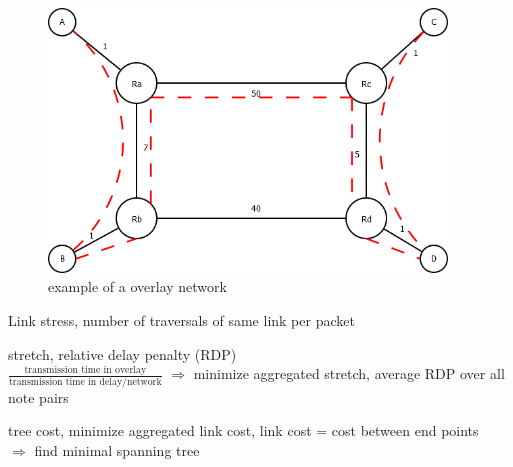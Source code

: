 \documentclass[ngerman,a4paper]{report}
\begin{document}
\begin{figure}[h]
	\centering
	\includegraphics[width=400px]{gfx/overlay_example.png}
	\caption{example of a overlay network}
	\label{img:ovrlnt}
\end{figure}

\begin{compactenum}
	\item Link stress, number of traversals of same link per packet
	\item stretch, relative delay penalty (RDP)\\
		$\frac{\text{transmission time in overlay}}{\text{transmission time in delay/network}}$
		$\Rightarrow$ minimize aggregated stretch, average RDP over all note pairs
	\item tree cost, minimize aggregated link cost, link cost = cost between end points\\
		$\Rightarrow$ find minimal spanning tree
\end{compactenum}
\end{document}

